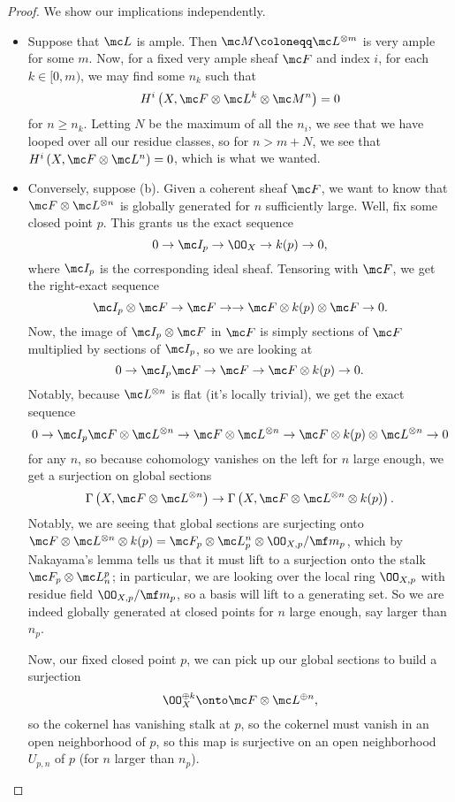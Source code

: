 \documentclass[../notes.tex]{subfiles}
\begin{document}
\begin{proof}
	We show our implications independently.
	\begin{itemize}
		\item Suppose that $\mc L$ is ample. Then $\mc M\coloneqq\mc L^{\otimes m}$ is very ample for some $m$. Now, for a fixed very ample sheaf $\mc F$ and index $i$, for each $k\in[0,m)$, we may find some $n_k$ such that
		\[H^i\left(X,\mc F\otimes\mc L^k\otimes\mc M^n\right)=0\]
		for $n\ge n_k$. Letting $N$ be the maximum of all the $n_i$, we see that we have looped over all our residue classes, so for $n>m+N$, we see that $H^i\left(X,\mc F\otimes\mc L^n\right)=0$, which is what we wanted.
		\item Conversely, suppose (b). Given a coherent sheaf $\mc F$, we want to know that $\mc F\otimes\mc L^{\otimes n}$ is globally generated for $n$ sufficiently large. Well, fix some closed point $p$. This grants us the exact sequence
		\[0\to\mc I_p\to\OO_X\to k(p)\to0,\]
		where $\mc I_p$ is the corresponding ideal sheaf. Tensoring with $\mc F$, we get the right-exact sequence
		\[\mc I_p\otimes\mc F\to\mc F\to\to\mc F\otimes k(p)\otimes\mc F\to0.\]
		Now, the image of $\mc I_p\otimes\mc F$ in $\mc F$ is simply sections of $\mc F$ multiplied by sections of $\mc I_p$, so we are looking at
		\[0\to\mc I_p\mc F\to\mc F\to\mc F\otimes k(p)\to0.\]
		Notably, because $\mc L^{\otimes n}$ is flat (it's locally trivial), we get the exact sequence
		\[0\to\mc I_p\mc F\otimes\mc L^{\otimes n}\to\mc F\otimes\mc L^{\otimes n}\to\mc F\otimes k(p)\otimes\mc L^{\otimes n}\to0\]
		for any $n$, so because cohomology vanishes on the left for $n$ large enough, we get a surjection on global sections
		\[\Gamma\left(X,\mc F\otimes\mc L^{\otimes n}\right)\to\Gamma\left(X,\mc F\otimes\mc L^{\otimes n}\otimes k(p)\right).\]
		Notably, we are seeing that global sections are surjecting onto $\mc F\otimes\mc L^{\otimes n}\otimes k(p)=\mc F_p\otimes\mc L^n_p\otimes\OO_{X,p}/\mf m_p$, which by Nakayama's lemma tells us that it must lift to a surjection onto the stalk $\mc F_p\otimes\mc L_n^p$; in particular, we are looking over the local ring $\OO_{X,p}$ with residue field $\OO_{X,p}/\mf m_p$, so a basis will lift to a generating set. So we are indeed globally generated at closed points for $n$ large enough, say larger than $n_p$.

		Now, our fixed closed point $p$, we can pick up our global sections to build a surjection
		\[\OO_X^{\oplus k}\onto\mc F\otimes\mc L^{\oplus n},\]
		so the cokernel has vanishing stalk at $p$, so the cokernel must vanish in an open neighborhood of $p$, so this map is surjective on an open neighborhood $U_{p,n}$ of $p$ (for $n$ larger than $n_p$).


\end{itemize}
\end{proof}
\end{document}
